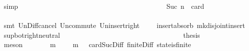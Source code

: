 \begin{isabellebody}
\ simp\isanewline
\ \ \ \ \ \ \ \ \ \ \ \ \isamarkupfalse%
\ \isamarkupfalse%
\ {\isachardoublequoteopen}{\isasymsigma}\ {\isasymunion}\ {\isasymsigma}{\isacharprime}\ {\isasymin}\ {\isasymSigma}{\isachardoublequoteclose}\isanewline
\ \ \ \ \ \ \ \ \ \ \ \ \ \ \isamarkupfalse%
\ {\isacartoucheopen}{\isasymforall}{\isasymsigma}{\isasymin}{\isasymSigma}{\isachardot}\ {\isasymforall}{\isasymsigma}{\isacharprime}{\isasymin}{\isasymSigma}{\isachardot}\ {\isasymnot}\ {\isasymsigma}\ {\isasymsubseteq}\ {\isasymsigma}{\isacharprime}\ {\isasymand}\ Suc\ n\ {\isacharequal}\ card\ {\isacharparenleft}{\isasymsigma}\ {\isacharminus}\ {\isasymsigma}{\isacharprime}{\isacharparenright}\ {\isasymlongrightarrow}\ {\isasymsigma}\ {\isasymunion}\ {\isasymsigma}{\isacharprime}\ {\isasymin}\ {\isasymSigma}{\isacartoucheclose}\isanewline
\ \ \ \ \ \ \ \ \ \ \ \ \ \ \isamarkupfalse%
\ {\isacharparenleft}smt\ Un{\isacharunderscore}Diff{\isacharunderscore}cancel\ Un{\isacharunderscore}commute\ Un{\isacharunderscore}insert{\isacharunderscore}right\ \ {\isacartoucheopen}{\isasymsigma}\ {\isasymin}\ {\isasymSigma}{\isacartoucheclose}\ insert{\isacharunderscore}absorb{}\ mk{\isacharunderscore}disjoint{\isacharunderscore}insert\ sup{\isacharunderscore}bot{\isachardot}right{\isacharunderscore}neutral{\isacharparenright}\isanewline
\ \ \ \ \ \ \ \ \ \ \isamarkupfalse%
\isanewline
\ \ \ \ \ \ \ \ \isamarkupfalse%
\isanewline
\ \ \ \ \ \ \isamarkupfalse%
\isanewline
\ \ \ \ \ \ \isamarkupfalse%
\ \isamarkupfalse%
\ {\isacharquery}thesis\isanewline
\ \ \ \ \ \ \ \ \isamarkupfalse%
\ {\isacharparenleft}meson\ {\isacartoucheopen}{\isasymforall}{\isasymsigma}{\isasymin}{\isasymSigma}{\isachardot}\ {\isasymforall}{\isasymsigma}{\isacharprime}{\isasymin}{\isasymSigma}{\isachardot}\ {\isasymnot}\ {\isasymsigma}\ {\isasymsubseteq}\ {\isasymsigma}{\isacharprime}\ {\isasymlongrightarrow}\ {\isacharparenleft}{\isasymexists}m{\isasymin}{\isasymsigma}\ {\isacharminus}\ {\isasymsigma}{\isacharprime}{\isachardot}\ {\isasymsigma}{\isacharprime}\ {\isasymunion}\ {\isacharbraceleft}m{\isacharbraceright}\ {\isasymin}\ {\isasymSigma}{\isacharparenright}{\isacartoucheclose}\ card{\isacharunderscore}Suc{\isacharunderscore}Diff{}\ finite{\isacharunderscore}Diff\ state{\isacharunderscore}is{\isacharunderscore}finite{\isacharparenright}\isanewline
\ \ \ \ \isamarkupfalse%
\isanewline
\ \ \ \ \isamarkupfalse%

\end{isabellebody}
